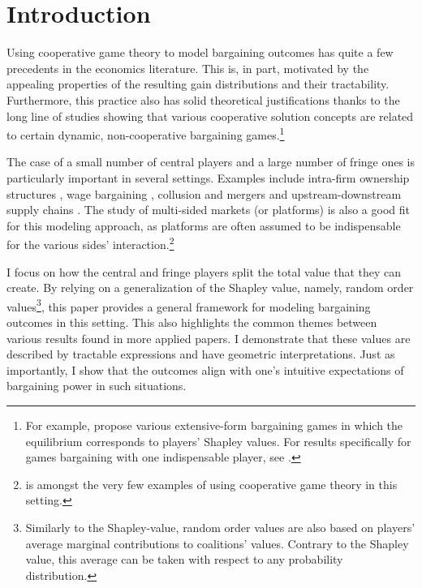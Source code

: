 \section{Introduction}

Using cooperative game theory to model bargaining outcomes has quite a few precedents in the economics literature.
This is, in part, motivated by the appealing properties of the resulting gain distributions and their tractability.
Furthermore, this practice also has solid theoretical justifications thanks to the long line of studies showing that various cooperative solution concepts are related to certain dynamic, non-cooperative bargaining games.\footnote{
    For example, \textcite{gul1989bargaining,winter1994demand,hart1996bargaining,inderst2003bargaining} propose various extensive-form bargaining games in which the equilibrium corresponds to players' Shapley values.
    For results specifically for games bargaining with one indispensable player, see \textcite{stole1996intra}.
}

The case of a small number of central players and a large number of fringe ones is particularly important in several settings.
Examples include intra-firm ownership structures \parencite{hart1990property}, wage bargaining \parencite{stole1996intra,stole1996organizational,levy1997individual}, collusion and mergers \parencite{segal2003collusion} and upstream-downstream supply chains \parencite{inderst2003bargaining,montez2007downstream}.
The study of multi-sided markets (or platforms) is also a good fit for this modeling approach, as platforms are often assumed to be indispensable for the various sides' interaction.\footnote{
    \textcite{huang2022shapley} is amongst the very few examples of using cooperative game theory in this setting.
}

I focus on how the central and fringe players split the total value that they can create.
By relying on a generalization of the Shapley value, namely, random order values\footnote{
    Similarly to the Shapley-value, random order values are also based on players' average marginal contributions to coalitions' values.
    Contrary to the Shapley value, this average can be taken with respect to any probability distribution.
}, this paper provides a general framework for modeling bargaining outcomes in this setting.
This also highlights the common themes between various results found in more applied papers.
I demonstrate that these values are described by tractable expressions and have geometric interpretations.
Just as importantly, I show that the outcomes align with one's intuitive expectations of bargaining power in such situations.

